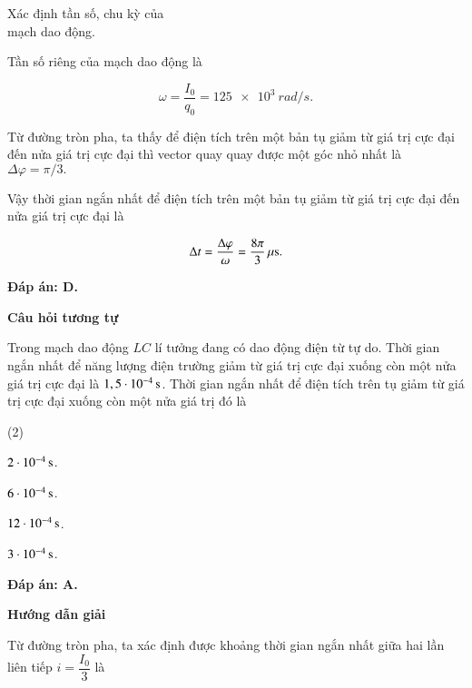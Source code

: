\begin{dang}{Xác định tần số, chu kỳ của\\ mạch dao động.}
{		Tần số riêng của mạch dao động là 
		
		$$\omega = \dfrac{I_0}{q_0} = \SI{125 e3}{rad/s}.$$ 
		
		Từ đường tròn pha, ta thấy để điện tích trên một bản tụ giảm từ giá trị cực đại đến nửa giá trị cực đại thì vector quay quay được một góc nhỏ nhất là $\Delta \varphi = \pi /3.$ 
		
		Vậy thời gian ngắn nhất để điện tích trên một bản tụ giảm từ giá trị cực đại đến nửa giá trị cực đại là
		
		$$\Delta t = \dfrac{\Delta \varphi}{\omega}  = \xsi{\dfrac{8\pi}{3}}{\mu s}.$$
		
		\textbf{Đáp án: D.}
		\begin{center}
			\textbf{Câu hỏi tương tự}
		\end{center}
		
		Trong mạch dao động $LC$ lí tưởng đang có dao động điện từ tự do. Thời gian ngắn nhất để năng lượng điện trường giảm từ giá trị cực đại xuống còn một nửa giá trị cực đại là $\xsi{1,5\cdot10^{-4}}{s}$. Thời gian ngắn nhất để điện tích trên tụ giảm từ giá trị cực đại xuống còn một nửa giá trị đó là
		\begin{mcq}(2)
			\item $\xsi{2\cdot10^{-4}}{s}$. 
			\item $\xsi{6\cdot10^{-4}}{s}$. 
			\item $\xsi{12\cdot10^{-4}}{s}$. 
			\item $\xsi{3\cdot10^{-4}}{s}$. 
		\end{mcq}
		
		\textbf{Đáp án: A.} 
	}
	{	\begin{center}
			\textbf{Hướng dẫn giải}
		\end{center}
		
		Từ đường tròn pha, ta xác định được khoảng thời gian ngắn nhất giữa hai lần liên tiếp $i =\dfrac{I_0}{3}$ là
		
}
\end{dang}
